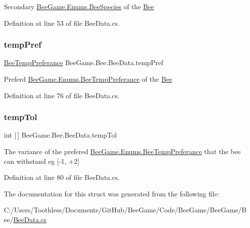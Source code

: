 Secondary \hyperlink{namespace_bee_game_1_1_enums_aa2ead984825678d83c42d48f6382619c}{Bee\+Game.\+Enums.\+Bee\+Species} of the \hyperlink{namespace_bee_game_1_1_bee}{Bee} 



Definition at line 53 of file Bee\+Data.\+cs.

\mbox{\label{struct_bee_game_1_1_bee_1_1_bee_data_ab7c3b5184d04319359a7f31fa0a4dc8c}} 
\subsubsection{\texorpdfstring{temp\+Pref}{tempPref}}
{\footnotesize\ttfamily \hyperlink{namespace_bee_game_1_1_enums_a9db0f9ac859fab168654d657f248b024}{Bee\+Temp\+Preferance} Bee\+Game.\+Bee.\+Bee\+Data.\+temp\+Pref}



Preferd \hyperlink{namespace_bee_game_1_1_enums_a9db0f9ac859fab168654d657f248b024}{Bee\+Game.\+Enums.\+Bee\+Temp\+Preferance} of the \hyperlink{namespace_bee_game_1_1_bee}{Bee} 



Definition at line 76 of file Bee\+Data.\+cs.

\mbox{\label{struct_bee_game_1_1_bee_1_1_bee_data_aa333655c6249bb86cba999dcdf45c614}} 
\subsubsection{\texorpdfstring{temp\+Tol}{tempTol}}
{\footnotesize\ttfamily int \mbox{[}$\,$\mbox{]} Bee\+Game.\+Bee.\+Bee\+Data.\+temp\+Tol}



The variance of the prefered \hyperlink{namespace_bee_game_1_1_enums_a9db0f9ac859fab168654d657f248b024}{Bee\+Game.\+Enums.\+Bee\+Temp\+Preferance} that the bee can withstand eg \mbox{[}-\/1, +2\mbox{]} 



Definition at line 80 of file Bee\+Data.\+cs.



The documentation for this struct was generated from the following file\+:\begin{DoxyCompactItemize}
\item 
C\+:/\+Users/\+Toothless/\+Documents/\+Git\+Hub/\+Bee\+Game/\+Code/\+Bee\+Game/\+Bee\+Game/\+Bee/\hyperlink{_bee_data_8cs}{Bee\+Data.\+cs}\end{DoxyCompactItemize}

